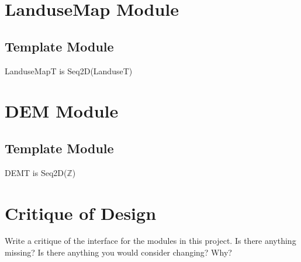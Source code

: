 \documentclass[12pt]{article}
\begin{document}
\newpage

\section* {LanduseMap Module}

\subsection* {Template Module}

LanduseMapT is Seq2D(LanduseT)

\section* {DEM Module}

\subsection* {Template Module}

DEMT is Seq2D($\mathbb{Z}$)

\newpage

\section*{Critique of Design}

Write a critique of the interface for the modules in this project.  Is there
anything missing?  Is there anything you would consider changing?  Why?
\end{document}
